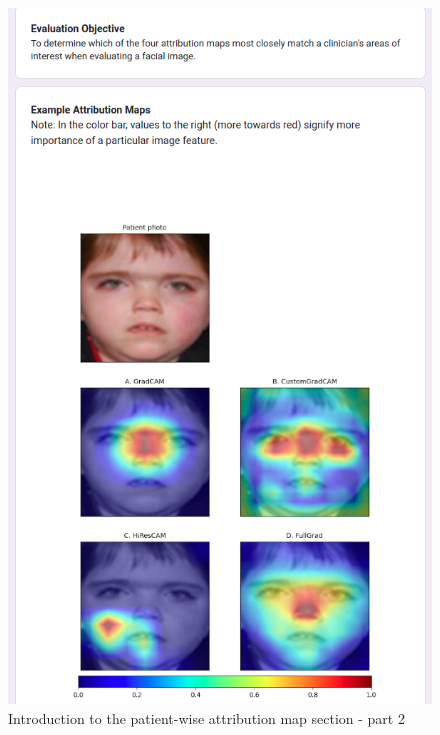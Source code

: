 \documentclass[../report.tex]{subfiles}
\begin{document}
		\begin{figure}
			\continuedfloat
			\centering
			\includegraphics[scale=0.55]{images/quest/5.png}
			\caption{Introduction to the patient-wise attribution map section - part 2}
						\label{fig_y}
			\addtocounter{figure}{1}
		\end{figure}
		
\end{document}

